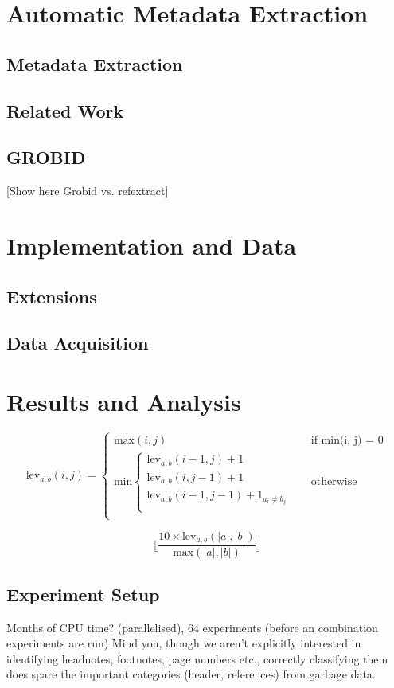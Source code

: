 \documentclass[10pt, oneside]{scrartcl}   	%
\begin{document}
\section{Automatic Metadata Extraction}
\subsection{Metadata Extraction}
\subsection{Related Work}
\subsection{GROBID}
[Show here Grobid vs. refextract]
\section{Implementation and Data}
\subsection{Extensions}
\subsection{Data Acquisition}
\section{Results and Analysis}
\[
  \text{lev}_{a, b}(i, j) = 
  \begin{cases} 
  	\text{max}(i, j) &\quad\text{if min(i, j) = 0} \\
	\text{min}
		\begin{cases}
			\text{lev}_{a, b}(i - 1, j) + 1 \\
			\text{lev}_{a, b}(i, j - 1) + 1 \\
			\text{lev}_{a, b}(i - 1, j - 1) + 1_{a_i \neq b_j} \\
		\end{cases} &\quad\text{otherwise} \\
  \end{cases}
\]

$$\Bigg \lfloor \frac{10 \times \text{lev}_{a, b}(|a|, |b|)}{\text{max}(|a|, |b|)}\Bigg  \rfloor$$

\subsection{Experiment Setup}
Months of CPU time? (parallelised), 64 experiments (before an combination experiments are run)
Mind you, though we aren't explicitly interested in identifying headnotes, footnotes, page numbers etc., correctly classifying them does spare the important categories (header, references) from garbage data.
\end{document}
